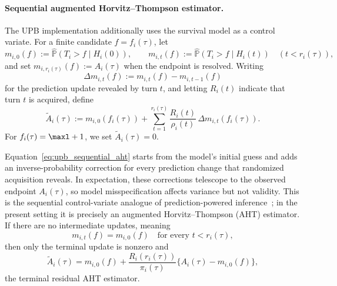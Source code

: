 \paragraph{Sequential augmented Horvitz--Thompson estimator.}
The UPB implementation additionally uses the survival model as a control
variate. For a finite candidate \(f=f_i(\tau)\), let
\begin{equation}
    m_{i,0}(f):=\widehat{\mathbb P}(T_i>f\mid H_i(0)),
    \qquad
    m_{i,t}(f):=\widehat{\mathbb P}(T_i>f\mid H_i(t))
    \quad(t<r_i(\tau)),
\end{equation}
and set \(m_{i,r_i(\tau)}(f):=A_i(\tau)\) when the endpoint is resolved.
Writing
\begin{equation}
    \Delta m_{i,t}(f):=m_{i,t}(f)-m_{i,t-1}(f)
    \label{eq:upb_prediction_update}
\end{equation}
for the prediction update revealed by turn \(t\), and letting \(R_i(t)\)
indicate that turn \(t\) is acquired, define
\begin{equation}
    \widetilde A_i(\tau)
    :=m_{i,0}(f_i(\tau))
      +\sum_{t=1}^{r_i(\tau)}
       \frac{R_i(t)}{\rho_i(t)}\,
       \Delta m_{i,t}(f_i(\tau)).
    \label{eq:upb_sequential_aht}
\end{equation}
For \(f_i(\tau)=\maxl+1\), we set \(\widetilde A_i(\tau)=0\).

Equation~\eqref{eq:upb_sequential_aht} starts from the model's initial guess
and adds an inverse-probability correction for every prediction change that
randomized acquisition reveals. In expectation, these corrections telescope
to the observed endpoint \(A_i(\tau)\), so model misspecification affects
variance but not validity. This is the sequential control-variate analogue of
prediction-powered inference~\citep{angelopoulos2023prediction}; in the
present setting it is precisely an augmented Horvitz--Thompson (AHT)
estimator. If there are no intermediate updates, meaning
\begin{equation}
    m_{i,t}(f)=m_{i,0}(f)
    \quad\text{for every }t<r_i(\tau),
    \label{eq:upb_no_intermediate_updates}
\end{equation}
then only the terminal update is nonzero and
\begin{equation}
    \widetilde A_i(\tau)
    =m_{i,0}(f)
     +\frac{R_i(r_i(\tau))}{\pi_i(\tau)}
       \{A_i(\tau)-m_{i,0}(f)\},
    \label{eq:upb_terminal_residual_aht}
\end{equation}
the terminal residual AHT estimator.


